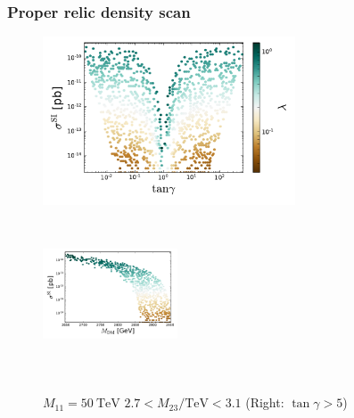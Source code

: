 \documentclass[%
xcolor=dvipsnames,table%
]{beamer}
\begin{document}
\begin{frame}
  \frametitle{Proper relic density scan}
\def\fh{5cm}
\begin{figure}
  \centering
  \includegraphics[height=\fh]{lambda}
\includegraphics[height=\fh,width=4cm]{ssi_Mdm}
  \caption{$M_{11}=50\ \text{TeV}$ $2.7<M_{23}/\text{TeV}<3.1$ \qquad  (Right:  $\tan\gamma>5$)}
\end{figure}
\end{frame}
\end{document}
